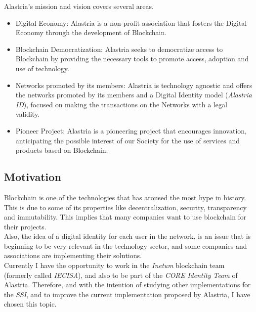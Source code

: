 \documentclass[a4paper, 12pt]{article} %
\begin{document}
        Alastria's mission and vision covers several areas.
        \begin{itemize}
            \item Digital Economy: Alastria is a non-profit association that fosters the Digital Economy through the development of Blockchain.
            \item Blockchain Democratization: Alastria seeks to democratize access to Blockchain by providing the necessary tools to promote access, adoption and use of technology.
            \item Networks promoted by its members: Alastria is technology agnostic and offers the networks promoted by its members and a Digital Identity model (\textit{Alastria ID}), focused on making the transactions on the Networks with a legal validity. 
            \item Pioneer Project: Alastria is a pioneering project that encourages innovation, anticipating the possible interest of our Society for the use of services and products based on Blockchain.
        \end{itemize}
        
        \subsection{Motivation}
            Blockchain is one of the technologies that has aroused the most hype in history. This is due to some of its properties like decentralization, security, transparency and immutability. This implies that many companies want to use blockchain for their projects.\\
            
            Also, the idea of a digital identity for each user in the network, is an issue that is beginning to be very relevant in the technology sector, and some companies and associations are implementing their solutions.\\
            
            Currently I have the opportunity to work in the \textit{Inetum} blockchain team (formerly called \textit{IECISA}), and also to be part of the \textit{CORE Identity Team} of Alastria. Therefore, and with the intention of studying other implementations for the \textit{SSI}, and to improve the current implementation proposed by Alastria, I have chosen this topic.
            
\end{document}
